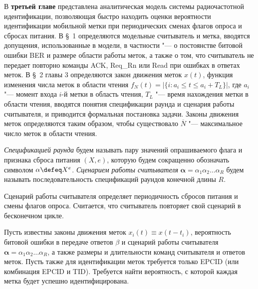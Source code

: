 В \textbf{третьей главе} представлена аналитическая модель системы радиочастотной идентификации, позволяющая быстро находить оценки вероятности идентификации мобильной метки при периодических сменах флагов опроса и сбросах питания. В \S~1 определяются модельные считыватель и метка, вводятся допущения, использованные в модели, в частности "--- о постоянстве битовой ошибки BER и размере области работы меток, а также о том, что считыватель не передает повторно команды ACK, Req\_Rn или Read при ошибках в ответах меток. В \S~2 главы 3 определяются закон движения меток $x(t)$, функция изменения числа меток в области чтения $f_N(t) = | \{ i: a_i \leqslant t \leqslant a_i + T_L \} |$, где $a_i$ "--- момент входа $i$-й метки в область чтения, $T_L$ "--- время нахождения метки в области чтения, вводятся понятия спецификации раунда и сценария работы считывателя, и приводится формальная постановка задачи. Законы движения меток определяются таким образом, чтобы существовало $\overline{N}$ "--- максимальное число меток в области чтения.

\begin{defn}
\textit{Спецификацией раунда} будем называть пару значений опрашиваемого флага и признака сброса питания $(X, e)$, которую будем сокращенно обозначать символом $\alpha \defeq X^{e}$. \textit{Сценарием работы считывателя} $\bm{\alpha} = \alpha_1 \alpha_2 \dots \alpha_R$ будем называть последовательность спецификаций раундов конечной длины $R$.
\end{defn}

Сценарий работы считывателя определяет периодичность сбросов питания и смены флагов опроса. Считается, что считыватель повторяет свой сценарий в бесконечном цикле.

\begin{probl}\label{probl:analytic_problem}
  Пусть известны законы движения меток $x_i(t) \equiv x(t - t_i)$, вероятность битовой ошибки в передаче ответов $\beta$ и сценарий работы считывателя $\bm{\alpha} = \alpha_1 \alpha_2 \dots \alpha_R$, а также размеры и длительности команд считывателя и ответов меток. Пусть также для идентификации меток требуется только EPCID (или комбинация EPCID и TID). Требуется найти вероятность, с которой каждая метка будет успешно идентифицирована.
\end{probl}

